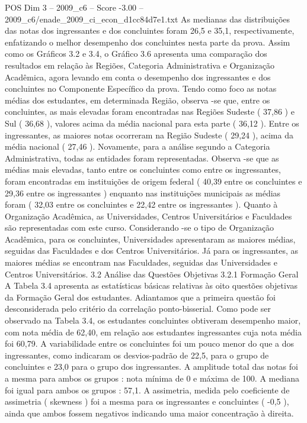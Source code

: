 \begin{textsample}{POS Dim 3 – 2009\_c6 – Score -3.00 – 2009\_c6/enade\_2009\_ci\_econ\_d1cc84d7e1.txt}
As medianas das distribuições das notas dos ingressantes e dos concluintes foram 26,5 e 35,1, respectivamente, enfatizando o melhor desempenho dos concluintes nesta parte da prova.
Assim como os Gráficos 3.2 e 3.4, o Gráfico 3.6 apresenta uma comparação dos resultados em relação às Regiões, Categoria Administrativa e Organização Acadêmica, agora levando em conta o desempenho dos ingressantes e dos concluintes no Componente Específico da prova.
Tendo como foco as notas médias dos estudantes, em determinada Região, observa -se que, entre os concluintes, as mais elevadas foram encontradas nas Regiões Sudeste ( 37,86 ) e Sul ( 36,68 ), valores acima da média nacional para esta parte ( 36,12 ).
Entre os ingressantes, as maiores notas ocorreram na Região Sudeste ( 29,24 ), acima da média nacional ( 27,46 ).
Novamente, para a análise segundo a Categoria Administrativa, todas as entidades foram representadas.
Observa -se que as médias mais elevadas, tanto entre os concluintes como entre os ingressantes, foram encontradas em instituições de origem federal ( 40,39 entre os concluintes e 29,36 entre os ingressantes ) enquanto nas instituições municipais as médias foram ( 32,03 entre os concluintes e 22,42 entre os ingressantes ).
Quanto à Organização Acadêmica, as Universidades, Centros Universitários e Faculdades são representadas com este curso.
Considerando -se o tipo de Organização Acadêmica, para os concluintes, Universidades apresentaram as maiores médias, seguidas das Faculdades e dos Centros Universitários.
Já para os ingressantes, as maiores médias se encontram nas Faculdades, seguidas das Universidades e Centros Universitários. 3.2 Análise das Questões Objetivas 3.2.1 Formação Geral A Tabela 3.4 apresenta as estatísticas básicas relativas às oito questões objetivas da Formação Geral dos estudantes.
Adiantamos que a primeira questão foi desconsiderada pelo critério da correlação ponto-bisserial.
Como pode ser observado na Tabela 3.4, os estudantes concluintes obtiveram desempenho maior, com nota média de 62,40, em relação aos estudantes ingressantes cuja nota média foi 60,79.
A variabilidade entre os concluintes foi um pouco menor do que a dos ingressantes, como indicaram os desvios-padrão de 22,5, para o grupo de concluintes e 23,0 para o grupo dos ingressantes.
A amplitude total das notas foi a mesma para ambos os grupos : nota mínima de 0 e máxima de 100.
A mediana foi igual para ambos os grupos : 57,1.
A assimetria, medida pelo coeficiente de assimetria ( skewness ) foi a mesma para os ingressantes e concluintes ( -0,5 ), ainda que ambos fossem negativos indicando uma maior concentração à direita.

\end{textsample}
